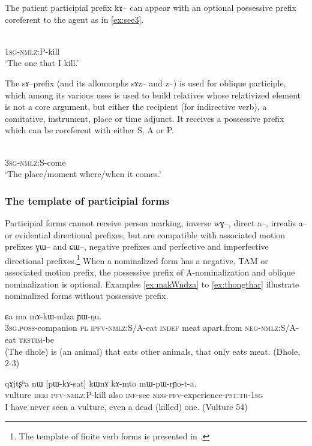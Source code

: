 \documentclass[oldfontcommands,oneside,a4paper,11pt]{article}
\newcommand{\ipa}[1]{{\phon #1}} %
\newcommand{\topic}{\textsc{dem}}
\begin{document}
  The patient participial prefix \ipa{kɤ--} can appear with an optional possessive prefix coreferent to the agent as in \ref{ex:see3}.
  
  \begin{exe}
\ex \label{ex:see3}
\gll \ipa{a-kɤ-mto}    \\
   \textsc{1sg-nmlz}:P-kill \\
 \glt  `The one that I kill.'
 \end{exe}

The \ipa{sɤ}--prefix (and its allomorphs \ipa{sɤz}-- and \ipa{z}--) is used for oblique participle, which among its various uses is used to build relatives whose relativized element is not a core argument, but either the recipient (for indirective verb), a comitative, instrument, place or time adjunct. It receives a possessive prefix  which can be coreferent with either S, A or P.

   \begin{exe}
\ex \label{ex:come}
\gll \ipa{ɯ-sɤ-ɣi}    \\
   \textsc{3sg-nmlz}:S-come \\
 \glt  `The place/moment where/when it comes.'
 \end{exe}
 
 
 
 \subsubsection{The template of participial forms}
 
Participial forms cannot receive person marking, inverse \ipa{wɣ}--, direct \ipa{a}--, irrealis \ipa{a}-- or evidential directional prefixes, but are compatible with associated motion prefixes \ipa{ɣɯ}-- and \ipa{ɕɯ}--, negative prefixes and perfective and imperfective directional prefixes.\footnote{The template of finite verb forms is presented in \citet{jacques13harmonization}.} When a nominalized form has a negative, TAM or associated motion prefix, the possessive prefix of A-nominalization and oblique nominalization is optional. Examples \ref{ex:makWndza} to \ref{ex:thongthar} illustrate nominalized forms without possessive prefix.
 

    \begin{exe}
\ex \label{ex:makWndza}
\gll
[\ipa{ɯ-zda}  	\ipa{ra}  	\ipa{cʰɯ-kɯ-ndza}]  	\ipa{ci,}  	\ipa{ɕa}  	\ipa{ma}  	\ipa{mɤ-kɯ-ndza}  	\ipa{ɲɯ-ŋu.}  	 \\
\textsc{3sg.poss}-companion  \textsc{pl} \textsc{ipfv-nmlz}:S/A-eat \textsc{indef} meat apart.from \textsc{neg-nmlz}:S/A-eat \textsc{testim}-be \\
\glt (The dhole) is (an animal) that eats other animals, that only eats meat. (Dhole, 2-3)
 \end{exe}
     \begin{exe}
\ex \label{ex:kill4}
\gll
\ipa{qɤjtʂʰa}  	\ipa{nɯ}  	[\ipa{pɯ-kɤ-sat}]  	\ipa{kɯnɤ}  	\ipa{kɤ-mto}  	\ipa{mɯ-pɯ-rɲo-t-a.}  \\
vulture \topic{} \textsc{pfv-nmlz:P}-kill  also \textsc{inf}-see \textsc{neg-pfv}-experience-\textsc{pst:tr-1sg} \\
\glt I have never seen a vulture, even a dead (killed) one. (Vulture 54)
 \end{exe}
  
\end{document}
